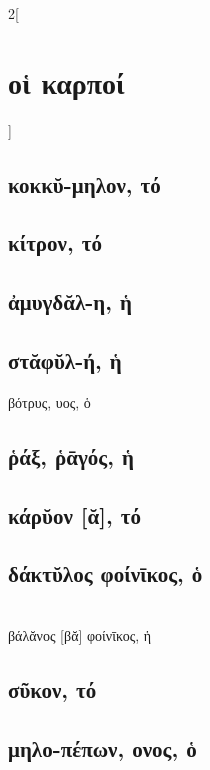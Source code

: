 \documentclass{book}
\begin{document}
\begin{multicols}{2}[\section{οἱ καρποί}]
\subsection{κοκκῠ-μηλον, τό}
\subsection{κίτρον, τό}
\subsection{ἀμυγδᾰλ-η, ἡ}
\subsection{στᾰφῠλ-ή, ἡ}
βότρυς, υος, ὁ
\subsection{ῥάξ, ῥᾱγός, ἡ}
\subsection{κάρῠον [ᾰ], τό}
\subsection{δάκτῠλος φοίνῑκος, ὁ}
 ~\\
βάλᾰνος [βᾰ] φοίνῑκος, ἡ
\subsection{σῦκον, τό}
\subsection{μηλο-πέπων, ονος, ὁ}
~
\end{multicols}
\newpage  
\end{document}

